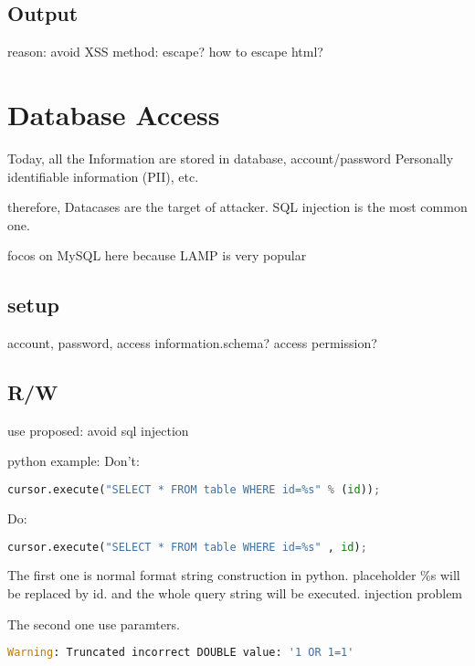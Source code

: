 \documentclass[12pt, a4paper]{article}
\begin{document}
\subsection{Output}
reason: avoid XSS
method: escape?
how to escape html?


%   
\section{Database Access}
Today,
all the Information are stored in database,
account/password
Personally identifiable information (PII),
etc.

therefore,
Datacases are the target of attacker.
SQL injection is the most common one.

focos on MySQL here because LAMP is very popular

\subsection{setup}
account, password, access
information.schema?
access permission?

\subsection{R/W}
use proposed: avoid sql injection

python example:
Don't:
\begin{lstlisting}[language=python]
cursor.execute("SELECT * FROM table WHERE id=%s" % (id));
\end{lstlisting}
Do:
\begin{lstlisting}[language=python]
cursor.execute("SELECT * FROM table WHERE id=%s" , id);
\end{lstlisting}
The first one is normal format string construction in python.
placeholder \%s will be replaced by id.
and the whole query string will be executed.
injection problem

The second one use paramters.
\begin{lstlisting}[language=python]
Warning: Truncated incorrect DOUBLE value: '1 OR 1=1'
\end{lstlisting}
\end{document}
